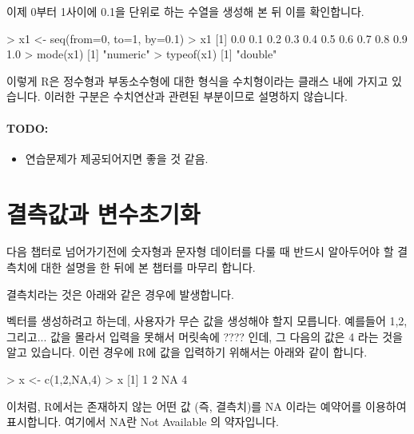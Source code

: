 \documentclass[tutorial.tex]{subfiles}
\begin{document}
이제 0부터 1사이에 0.1을 단위로 하는 수열을 생성해 본 뒤 이를 확인합니다. 

\begin{Schunk}
\begin{Soutput}
> x1 <- seq(from=0, to=1, by=0.1)
> x1
 [1] 0.0 0.1 0.2 0.3 0.4 0.5 0.6 0.7 0.8 0.9 1.0
> mode(x1)
[1] "numeric"
> typeof(x1)
[1] "double"
 
\end{Soutput}
\end{Schunk}

이렇게 R은 정수형과 부동소수형에 대한 형식을 수치형이라는 클래스 내에 가지고 있습니다. 
이러한 구분은 수치연산과 관련된 부분이므로 설명하지 않습니다. 



\paragraph{TODO:}
\begin{itemize}
	\item 연습문제가 제공되어지면 좋을 것 같음. 
\end{itemize}

%
%
%

\section{결측값과 변수초기화} 

다음 챕터로 넘어가기전에 숫자형과 문자형 데이터를 다룰 때 반드시 알아두어야 할 결측치에 대한 설명을 한 뒤에 본 챕터를 마무리 합니다.

결측치라는 것은 아래와 같은 경우에 발생합니다. 

벡터를 생성하려고 하는데, 사용자가 무슨 값을 생성해야 할지 모릅니다. 
예를들어 1,2, 그리고... 값을 몰라서 입력을 못해서 머릿속에 ???? 인데, 그 다음의 값은 4 라는 것을 알고 있습니다. 
이런 경우에 R에 값을 입력하기 위해서는 아래와 같이 합니다. 

\begin{Schunk}
\begin{Soutput}
> x <- c(1,2,NA,4)
> x
[1]  1  2 NA  4
\end{Soutput}
\end{Schunk}

이처럼, R에서는 존재하지 않는 어떤 값 (즉, 결측치)를 NA 이라는 예약어를 이용하여 표시합니다. 
여기에서 NA란 Not Available 의 약자입니다. 
\end{document}
